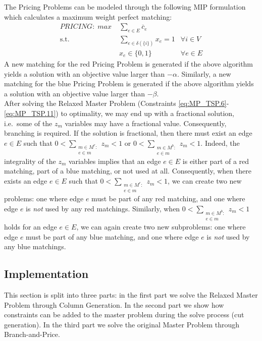 \documentclass[a4paper]{article}
\begin{document}
The Pricing Problems can be modeled through the following MIP formulation which calculates a maximum weight perfect matching:
\begin{align}
\label{eq:PRICE_TSP.0} \mathit{PRICING:}\; max\; &\sum_{e\in E}\overline{c}_e &\\
\label{eq:PRICE_TSP.1} \mbox{s.t. }&\sum_{e\in \delta(\{i\})}x_e=1& \forall i\in V\\
\label{eq:PRICE_TSP.2} &x_e\in \{0,1\}& \forall e\in E
\end{align}
A new matching for the red Pricing Problem is generated if the above algorithm yields a solution with an objective value larger than $-\alpha$. Similarly, a new matching for the blue Pricing Problem is generated if the above algorithm yields a solution with an objective value larger than $-\beta$.\\
After solving the Relaxed Master Problem (Constraints \eqref{eq:MP_TSP.6}-\eqref{eq:MP_TSP.11}) to optimality, we may end up with a fractional solution, i.e.\ some of the $z_m$ variables may have a fractional value. Consequently, branching is required. If the solution is fractional, then there must exist an edge $e\in E$ such that $0<\sum\limits_{\substack{m\in M^r:\\e\in m}}z_m<1$ or $0<\sum\limits_{\substack{m\in M^b:\\e\in m}}z_m<1$. Indeed, the integrality of the $z_m$ variables implies that an edge $e\in E$ is either part of a red matching, part of a blue matching, or not used at all. Consequently, when there exists an edge $e\in E$ such that $0<\sum\limits_{\substack{m\in M^r:\\e\in m}}z_m<1$, we can create two new problems: one where edge $e$ must be part of any red matching, and one where edge $e$ is \emph{not} used by any red matchings. Similarly, when $0<\sum\limits_{\substack{m\in M^b:\\e\in m}}z_m<1$ holds for an edge $e\in E$, we can again create two new subproblems: one where edge $e$ must be part of any blue matching, and one where edge $e$ is \emph{not} used by any blue matchings.

\subsection{Implementation}
This section is split into three parts: in the first part we solve the Relaxed Master Problem through Column Generation. In the second part we show how constraints can be added to the master problem during the solve process (cut generation). In the third part we solve the original Master Problem through Branch-and-Price.
\end{document}
